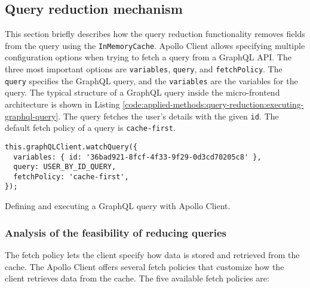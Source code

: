 \subsection{Query reduction mechanism}\label{subsection:applied-methods:query-reduction:how-does-the-library-work}

This section briefly describes how the query reduction functionality removes fields from the query using the \texttt{InMemoryCache}. Apollo Client allows specifying multiple configuration options when trying to fetch a query from a GraphQL \ac{API}. The three most important options are \texttt{variables}, \texttt{query}, and \texttt{fetchPolicy}. The \texttt{query} specifies the GraphQL query, and the \texttt{variables} are the variables for the query. The typical structure of a GraphQL query inside the micro-frontend architecture is shown in Listing \ref{code:applied-methods:query-reduction:executing-graphql-query}. The query fetches the user's details with the given \texttt{id}. The default fetch policy of a query is \texttt{cache-first}.  

\ifshowListings
\begin{listing}[H]
\begin{verbatim}
this.graphQLClient.watchQuery({
  variables: { id: '36bad921-8fcf-4f33-9f29-0d3cd70205c8' },
  query: USER_BY_ID_QUERY,
  fetchPolicy: 'cache-first',
});
\end{verbatim}
\caption{Defining and executing a GraphQL query with Apollo Client.}\label{code:applied-methods:query-reduction:executing-graphql-query}
\end{listing}
\fi

\subsubsection{Analysis of the feasibility of reducing queries}

The fetch policy lets the client specify how data is stored and retrieved from the cache. The Apollo Client offers several fetch policies that customize how the client retrieves data from the cache. The five available fetch policies are: \cite{misc:-:applied-methods:query-reduction:apollo-client:queries}


